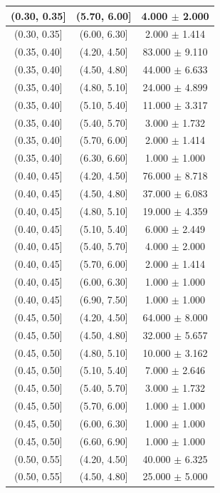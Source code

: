 \begin{longtable}{|c|c|c|}
\hline
(0.30, 0.35] & (5.70, 6.00] & 4.000 $\pm$ 2.000 \\ 
\hline
(0.30, 0.35] & (6.00, 6.30] & 2.000 $\pm$ 1.414 \\ 
\hline
(0.35, 0.40] & (4.20, 4.50] & 83.000 $\pm$ 9.110 \\ 
\hline
(0.35, 0.40] & (4.50, 4.80] & 44.000 $\pm$ 6.633 \\ 
\hline
(0.35, 0.40] & (4.80, 5.10] & 24.000 $\pm$ 4.899 \\ 
\hline
(0.35, 0.40] & (5.10, 5.40] & 11.000 $\pm$ 3.317 \\ 
\hline
(0.35, 0.40] & (5.40, 5.70] & 3.000 $\pm$ 1.732 \\ 
\hline
(0.35, 0.40] & (5.70, 6.00] & 2.000 $\pm$ 1.414 \\ 
\hline
(0.35, 0.40] & (6.30, 6.60] & 1.000 $\pm$ 1.000 \\ 
\hline
(0.40, 0.45] & (4.20, 4.50] & 76.000 $\pm$ 8.718 \\ 
\hline
(0.40, 0.45] & (4.50, 4.80] & 37.000 $\pm$ 6.083 \\ 
\hline
(0.40, 0.45] & (4.80, 5.10] & 19.000 $\pm$ 4.359 \\ 
\hline
(0.40, 0.45] & (5.10, 5.40] & 6.000 $\pm$ 2.449 \\ 
\hline
(0.40, 0.45] & (5.40, 5.70] & 4.000 $\pm$ 2.000 \\ 
\hline
(0.40, 0.45] & (5.70, 6.00] & 2.000 $\pm$ 1.414 \\ 
\hline
(0.40, 0.45] & (6.00, 6.30] & 1.000 $\pm$ 1.000 \\ 
\hline
(0.40, 0.45] & (6.90, 7.50] & 1.000 $\pm$ 1.000 \\ 
\hline
(0.45, 0.50] & (4.20, 4.50] & 64.000 $\pm$ 8.000 \\ 
\hline
(0.45, 0.50] & (4.50, 4.80] & 32.000 $\pm$ 5.657 \\ 
\hline
(0.45, 0.50] & (4.80, 5.10] & 10.000 $\pm$ 3.162 \\ 
\hline
(0.45, 0.50] & (5.10, 5.40] & 7.000 $\pm$ 2.646 \\ 
\hline
(0.45, 0.50] & (5.40, 5.70] & 3.000 $\pm$ 1.732 \\ 
\hline
(0.45, 0.50] & (5.70, 6.00] & 1.000 $\pm$ 1.000 \\ 
\hline
(0.45, 0.50] & (6.00, 6.30] & 1.000 $\pm$ 1.000 \\ 
\hline
(0.45, 0.50] & (6.60, 6.90] & 1.000 $\pm$ 1.000 \\ 
\hline
(0.50, 0.55] & (4.20, 4.50] & 40.000 $\pm$ 6.325 \\ 
\hline
(0.50, 0.55] & (4.50, 4.80] & 25.000 $\pm$ 5.000 \\ 

\end{longtable}
